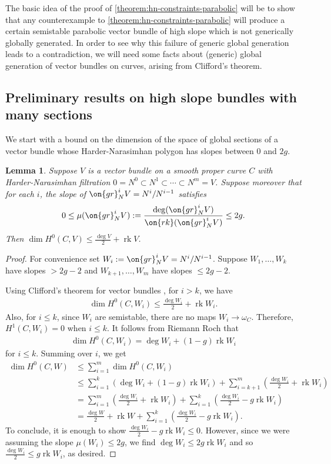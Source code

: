 \documentclass[12 pt]{amsart}
\theoremstyle{plain}
\newtheorem{lemma}[subsubsection]{Lemma}
\theoremstyle{definition}
\theoremstyle{remark}
\numberwithin{equation}{section}
\DeclareMathOperator\rk{rk}
\begin{document}
The basic idea of the proof of \autoref{theorem:hn-constraints-parabolic} will be to show that any counterexample to
\autoref{theorem:hn-constraints-parabolic} will produce a certain semistable parabolic vector bundle of high
slope which is not generically globally generated. 
In order to see why this failure of generic global generation
leads to a contradiction, we will need some facts about (generic) global generation of vector bundles on curves, arising from Clifford's theorem.

\subsection{Preliminary results on high slope bundles with many sections}
\label{subsection:high-slope-lemmas}
We start with a bound on the dimension of the space of global sections of a vector bundle 
whose Harder-Narasimhan polygon has slopes between $0$ and $2g$.
\begin{lemma}
	\label{lemma:cohomology-bound}
	Suppose $V$ is a vector bundle on a smooth proper curve $C$ with Harder-Narasimhan filtration $0 = N^0 \subset N^1 \subset \cdots \subset N^m = V$. Suppose moreover that for each $i$, the slope of $\on{gr}^i_{N} V=N^i/N^{i-1}$ 
	satisfies $$0\leq \mu(\on{gr}^i_{N} V):=\frac{\deg(\on{gr}^i_{N}V)}{\on{rk}(\on{gr}^i_{N}V)}\leq 2g.$$ 
	Then $\dim H^0(C, V) \leq \frac{\deg V}{2} + \rk V$.
\end{lemma}
\begin{proof}
	For convenience set $W_i := \on{gr}^i_{N}V=N^i/N^{i-1}$.
Suppose $W_1, \ldots, W_k$ have slopes $> 2g-2$ and $W_{k+1}, \ldots,
	W_m$ have slopes $\leq 2g-2$.

	Using Clifford's theorem for vector bundles 
	\cite[Theorem 2.1]{brambila-pazGN:geography-of-brill-noether-loci}, 
	for $i > k$,	
	we have 
	\begin{align*}
	\dim H^0(C, W_i)
	\leq \frac{\deg W_i}{2} + \rk W_i.
	\end{align*}
	Also, for $i \leq k$, since $W_i$ are semistable, there are no maps $W_i \to
	\omega_C$.
	Therefore, $H^1(C, W_i) = 0$ when $i \leq k$.
	It follows from Riemann Roch that 
	\begin{align*}
	\dim H^0(C, W_i) = \deg W_i + (1-g) \rk W_i
	\end{align*}
	for $i \leq k$.
	Summing over $i$, we get
	\begin{align*}
		\dim H^0(C, W) &\leq \sum_{i=1}^m \dim H^0(C, W_i) \\
		&\leq \sum_{i=1}^k (\deg W_i + (1-g) \rk W_i)
+ \sum_{i=k+1}^m (\frac{\deg
	W_i}{2} + \rk W_i) \\
		&= \sum_{i=1}^m (\frac{\deg W_i}{2} + \rk W_i)
		+ \sum_{i=1}^k (\frac{\deg W_i}{2} -g \rk W_i) \\
		&= \frac{\deg W}{2} + \rk W+ \sum_{i=1}^k (\frac{\deg W_i}{2} -g \rk
		W_i).
	\end{align*}
	To conclude, it is enough to show 
	$\frac{\deg W_i}{2} -g \rk W_i \le 0$.
	However, since we were assuming the slope $\mu(W_i) \leq 2g$, we find
	$\deg W_i \leq 2g \rk W_i$ and so $\frac{\deg W_i}{2} \leq g \rk W_i$,
	as desired.
\end{proof}
\end{document}
